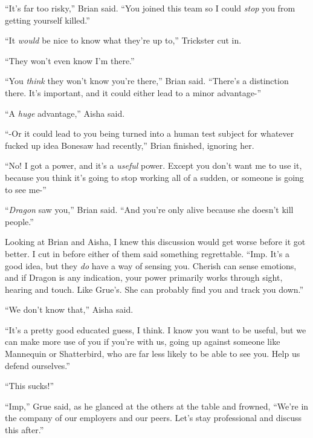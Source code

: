 ``It's far too risky,'' Brian said.  ``You joined this team so I could \emph{stop} you from getting yourself killed.''



``It \emph{would} be nice to know what they're up to,'' Trickster cut in.



``They won't even know I'm there.''



``You \emph{think} they won't know you're there,'' Brian said.  ``There's a distinction there.  It's important, and it could either lead to a minor advantage-''



``A \emph{huge} advantage,'' Aisha said.



``-Or it could lead to you being turned into a human test subject for whatever fucked up idea Bonesaw had recently,'' Brian finished, ignoring her.



``No!  I got a power, and it's a \emph{useful} power.  Except you don't want me to use it, because you think it's going to stop working all of a sudden, or someone is going to see me-''



``\emph{Dragon} saw you,'' Brian said.  ``And you're only alive because she doesn't kill people.''



Looking at Brian and Aisha, I knew this discussion would get worse before it got better.  I cut in before either of them said something regrettable.  ``Imp.  It's a good idea, but they \emph{do} have a way of sensing you.  Cherish can sense emotions, and if Dragon is any indication, your power primarily works through sight, hearing and touch.  Like Grue's.  She can probably find you and track you down.''



``We don't know that,'' Aisha said.



``It's a pretty good educated guess, I think.  I know you want to be useful, but we can make more use of you if you're with us, going up against someone like Mannequin or Shatterbird, who are far less likely to be able to see you.  Help us defend ourselves.''



``This sucks!''



``Imp,'' Grue said, as he glanced at the others at the table and frowned, ``We're in the company of our employers and our peers.  Let's stay professional and discuss this after.''



